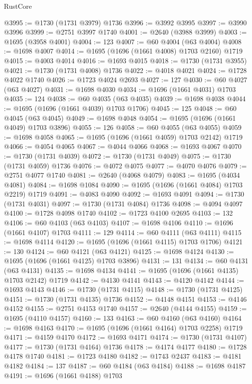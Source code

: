 \begin{lexlean}{RustCore}
\begin{coremodule}
@3995 := @1730 (@1731 @3979) @1736
@3996 := @3992 @3995
@3997 := @3990 @3996
@3999 := @2751 @3997 @1740
@4001 := @2640 (@3988 @3999)
@4003 := @1695 (@3958 @4001)
@4004 := 123
@4007 := @60 @4004 (@63 @4004)
@4008 := @1698 @4007
@4014 := @1695 (@1696 (@1661 @4008) @1703 @2160) @1719
@4015 := @4003 @4014
@4016 := @1693 @4015
@4018 := @1730 (@1731 @3955)
@4021 := @1730 (@1731 @4008) @1736
@4022 := @4018 @4021
@4024 := @1728 @4022 @1740
@4026 := @1723 @4024 @2693
@4027 := 127
@4030 := @60 @4027 (@63 @4027)
@4031 := @1698 @4030
@4034 := @1696 (@1661 @4031) @1703
@4035 := 124
@4038 := @60 @4035 (@63 @4035)
@4039 := @1698 @4038
@4044 := @1695 (@1696 (@1661 @4039) @1703 @1706)
@4045 := 125
@4048 := @60 @4045 (@63 @4045)
@4049 := @1698 @4048
@4054 := @1695 (@1696 (@1661 @4049) @1703 @3896)
@4055 := 126
@4058 := @60 @4055 (@63 @4055)
@4059 := @1698 @4058
@4065 := @1695 (@1696 (@1661 @4059) @1703 @2142) @1719
@4066 := @4054 @4065
@4067 := @4044 @4066
@4068 := @1693 @4067
@4070 := @1730 (@1731 @4039)
@4072 := @1730 (@1731 @4049)
@4075 := @1730 (@1731 @4059) @1736
@4076 := @4072 @4075
@4077 := @4070 @4076
@4079 := @2751 @4077 @1740
@4081 := @2640 (@4068 @4079)
@4083 := @1695 (@4034 @4081)
@4084 := @1698 @1084
@4090 := @1695 (@1696 (@1661 @4084) @1703 @2219) @1719
@4091 := @4083 @4090
@4092 := @1693 @4091
@4094 := @1730 (@1731 @4031)
@4097 := @1730 (@1731 @4084) @1736
@4098 := @4094 @4097
@4100 := @1728 @4098 @1740
@4102 := @1723 @4100 @2695
@4103 := 132
@4106 := @60 @4103 (@63 @4103)
@4107 := @1698 @4106
@4110 := @1696 (@1661 @4107) @1703
@4111 := 129
@4114 := @60 @4111 (@63 @4111)
@4115 := @1698 @4114
@4120 := @1695 (@1696 (@1661 @4115) @1703 @1706)
@4121 := 130
@4124 := @60 @4121 (@63 @4121)
@4125 := @1698 @4124
@4130 := @1695 (@1696 (@1661 @4125) @1703 @3896)
@4131 := 131
@4134 := @60 @4131 (@63 @4131)
@4135 := @1698 @4134
@4141 := @1695 (@1696 (@1661 @4135) @1703 @2142) @1719
@4142 := @4130 @4141
@4143 := @4120 @4142
@4144 := @1693 @4143
@4146 := @1730 (@1731 @4115)
@4148 := @1730 (@1731 @4125)
@4151 := @1730 (@1731 @4135) @1736
@4152 := @4148 @4151
@4153 := @4146 @4152
@4155 := @2751 @4153 @1740
@4157 := @2640 (@4144 @4155)
@4159 := @1695 (@4110 @4157)
@4160 := 133
@4163 := @60 @4160 (@63 @4160)
@4164 := @1698 @4163
@4170 := @1695 (@1696 (@1661 @4164) @1703 @2258) @1719
@4171 := @4159 @4170
@4172 := @1693 @4171
@4174 := @1730 (@1731 @4107)
@4177 := @1730 (@1731 @4164) @1736
@4178 := @4174 @4177
@4180 := @1728 @4178 @1740
@4181 := @1723 @4180
@4182 := @1743 @2437
@4183 := @4181 @4182
@4184 := 137
@4187 := @60 @4184 (@63 @4184)
@4188 := @1698 @4187
@4191 := @1696 (@1661 @4188) @1703

\end{coremodule}
\end{lexlean}
